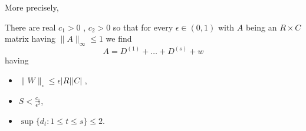 	More precisely,
	\begin{proposition}
		There are real \(c_1 > 0\) , \(c_2 > 0\) so that for every \(\epsilon \in \left( 0, 1 \right) \) with \(A\) being an \(R \times C\) matrix having \(\|A\|_{\infty} \le 1\) we find \[
		A = D^{\left( 1 \right) } + \ldots + D^{\left( s \right) } + w
		\] having
		\begin{itemize}
			\item \(\| W \|_{\square} \le \epsilon \left| R \right|\left| C \right|   \) ,
			\item \(S < \frac{c_1}{\epsilon^2}\),
			\item \(\sup \{ d_{t} :1 \le t\le s  \} \le 2 \).
		\end{itemize}
	\end{proposition}
